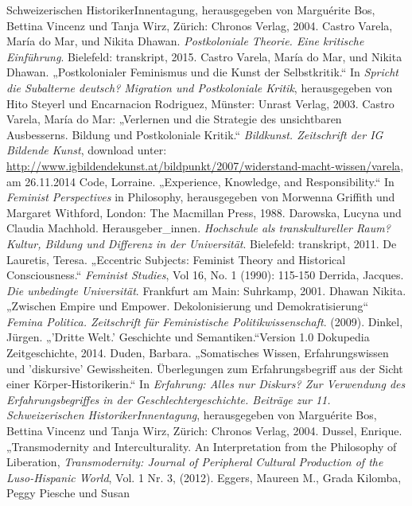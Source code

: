 \begin{thebibliography}{100}
{Schweizerischen HistorikerInnentagung}, herausgegeben von Marguérite Bos, Bettina Vincenz und Tanja Wirz, Zürich: Chronos Verlag, 2004.
 Castro Varela, María do Mar, und Nikita Dhawan. \emph{Postkoloniale Theorie. Eine kritische
Einführung}. Bielefeld: transkript, 2015.
 Castro Varela, María do Mar, und Nikita Dhawan. „Postkolonialer Feminismus und die Kunst der
Selbstkritik.“ In \emph{Spricht die Subalterne deutsch? Migration und
Postkoloniale Kritik},
herausgegeben von Hito Steyerl und Encarnacion Rodriguez, Münster: Unrast Verlag, 2003.
 Castro Varela, María do Mar: „Verlernen und die Strategie des unsichtbaren Ausbesserns. Bildung 
und Postkoloniale Kritik.“ \emph{Bildkunst. Zeitschrift der IG Bildende Kunst},
download unter:
\url{http://www.igbildendekunst.at/bildpunkt/2007/widerstand-macht-wissen/varela}, am 26.11.2014
 Code, Lorraine. „Experience, Knowledge, and Responsibility.“ In
\emph{Feminist Perspectives} in
Philosophy, herausgegeben von Morwenna Griffith und Margaret Withford, London: The Macmillan Press, 1988. 
 Darowska, Lucyna und Claudia Machhold. Herausgeber\_innen.
\emph{Hochschule als transkultureller
Raum? Kultur, Bildung und Differenz in der Universität}. Bielefeld: transkript, 2011. 
 De Lauretis, Teresa. „Eccentric Subjects: Feminist Theory
and Historical Consciousness.“ \emph{Feminist Studies}, Vol 16, No. 1 (1990): 115-150 
 Derrida, Jacques. \emph{Die unbedingte Universität}. Frankfurt am Main: Suhrkamp, 2001.
 Dhawan Nikita. „Zwischen Empire und Empower. Dekolonisierung und Demokratisierung“ 
\emph{Femina Politica. Zeitschrift für Feministische Politikwissenschaft}. (2009).
 Dinkel, Jürgen. „'Dritte Welt.' Geschichte und Semantiken.“Version 1.0 Dokupedia Zeitgeschichte,
     2014. 
 Duden, Barbara. „Somatisches Wissen, Erfahrungswissen und 'diskursive' Gewissheiten.
Überlegungen zum Erfahrungsbegriff aus der Sicht einer Körper-Historikerin.“ In
\emph{Erfahrung: Alles nur Diskurs? Zur Verwendung des Erfahrungsbegriffes in
  der Geschlechtergeschichte. Beiträge zur 11. Schweizerischen
HistorikerInnentagung}, herausgegeben von Marguérite Bos, Bettina Vincenz und Tanja Wirz,  Zürich: Chronos Verlag, 2004.
 Dussel, Enrique. „Transmodernity and Interculturality. An Interpretation from the Philosophy of
Liberation, \emph{Transmodernity: Journal of Peripheral Cultural Production
of the Luso-Hispanic World}, Vol. 1 Nr. 3, (2012).
 Eggers, Maureen M., Grada Kilomba, Peggy Piesche und Susan

\end{thebibliography}
